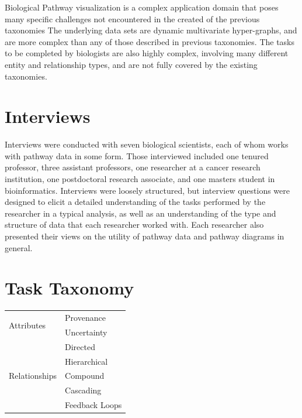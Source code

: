 \documentclass[journal]{vgtc}                %
\begin{document}

Biological Pathway visualization is a complex application domain that poses many specific challenges not encountered in the created of the previous taxonomies
The underlying data sets are dynamic multivariate hyper-graphs, and are more complex than any of those described in previous taxonomies.
The tasks to be completed by biologists are also highly complex, involving many different entity and relationship types, and are not fully covered by the existing taxonomies.


\section{Interviews}

Interviews were conducted with seven biological scientists, each of whom works with pathway data in some form.
Those interviewed included one tenured professor, three assistant professors, one researcher at a cancer research institution, one postdoctoral research associate, and one masters student in bioinformatics.
Interviews were loosely structured, but interview questions were designed to elicit a detailed understanding of the tasks performed by the researcher in a typical analysis, as well as an understanding of the type and structure of data that each researcher worked with.
Each researcher also presented their views on the utility of pathway data and pathway diagrams in general.

\section{Task Taxonomy}

\begin{table}
  \begin{tabular}{| l | l |}
    \hline
    \multirow{2}{*}{Attributes} & Provenance \\
    & Uncertainty \\ \hline
    \multirow{5}{*}{Relationships} & Directed \\
    & Hierarchical \\
    & Compound \\
    & Cascading \\
    & Feedback Loops \\ \hline
  \end{tabular}
\end{table}
\end{document}
